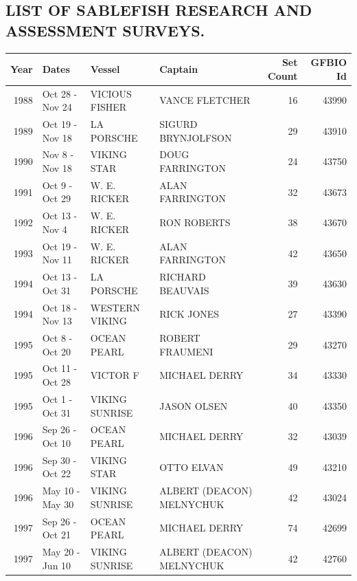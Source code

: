 \documentclass[12pt]{article}\usepackage[]{graphicx}\usepackage[]{color}
\begin{document}
\begin{appendices}

\clearpage

\section{LIST OF SABLEFISH RESEARCH AND ASSESSMENT SURVEYS.}
\label{app:first-appendix}

\begingroup\fontsize{8}{10}\selectfont
\begin{longtable}{rlllrr}
\toprule
\textbf{Year} & \textbf{Dates} & \textbf{Vessel} & \textbf{Captain} & \textbf{Set Count} & \textbf{GFBIO Id}\\
\midrule
1988 & Oct 28  - Nov 24 & VICIOUS FISHER & VANCE FLETCHER & 16 & 43990\\
1989 & Oct 19  - Nov 18 & LA PORSCHE & SIGURD BRYNJOLFSON & 29 & 43910\\
1990 & Nov  8  - Nov 18 & VIKING STAR & DOUG FARRINGTON & 24 & 43750\\
1991 & Oct  9  - Oct 29 & W. E. RICKER & ALAN FARRINGTON & 32 & 43673\\
1992 & Oct 13  - Nov  4 & W. E. RICKER & RON ROBERTS & 38 & 43670\\
1993 & Oct 19  - Nov 11 & W. E. RICKER & ALAN FARRINGTON & 42 & 43650\\
1994 & Oct 13  - Oct 31 & LA PORSCHE & RICHARD BEAUVAIS & 39 & 43630\\
1994 & Oct 18  - Nov 13 & WESTERN VIKING & RICK JONES & 27 & 43390\\
1995 & Oct  8  - Oct 20 & OCEAN PEARL & ROBERT FRAUMENI & 29 & 43270\\
1995 & Oct 11  - Oct 28 & VICTOR F & MICHAEL DERRY & 34 & 43330\\
1995 & Oct  1  - Oct 31 & VIKING SUNRISE & JASON OLSEN & 40 & 43350\\
1996 & Sep 26  - Oct 10 & OCEAN PEARL & MICHAEL DERRY & 32 & 43039\\
1996 & Sep 30  - Oct 22 & VIKING STAR & OTTO ELVAN & 49 & 43210\\
1996 & May 10  - May 30 & VIKING SUNRISE & ALBERT (DEACON) MELNYCHUK & 42 & 43024\\
1997 & Sep 26  - Oct 21 & OCEAN PEARL & MICHAEL DERRY & 74 & 42699\\
1997 & May 20  - Jun 10 & VIKING SUNRISE & ALBERT (DEACON) MELNYCHUK & 42 & 42760\\

\end{longtable}
\end{appendices}
\end{document}
